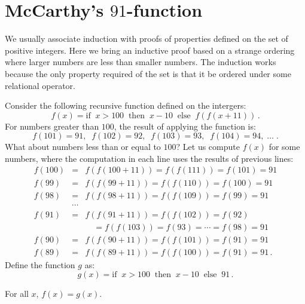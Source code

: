 \section{McCarthy's $91$-function}\label{s.induction-mccarthy}

We usually associate induction with proofs of properties defined on the set of positive integers. Here we bring an inductive proof based on a strange ordering where larger numbers are less than smaller numbers. The induction works because the only property required of the set is that it be ordered under some relational operator.

Consider the following recursive function defined on the intergers:
\[
f(x) = \textrm{if}\;\; x > 100 \;\;\textrm{then}\;\; x - 10 \;\;\textrm{else}\;\; f(f(x+11))\,.
\]
For numbers greater than $100$, the result of applying the function is:
\[
f(101) = 91, \;\; f(102) = 92,\;\; f(103) = 93,\;\; f(104) = 94,\;\ldots\;.
\]
What about numbers less than or equal to $100$? Let us compute $f(x)$ for some numbers, where the computation in each line uses the results of previous lines:
\begin{eqnarray*}
f(100) &=& f(f(100+11)) = f(f(111)) = f(101) = 91\\
f(99) &=& f(f(99+11)) = f(f(110)) = f(100) = 91\\
f(98) &=& f(f(98+11)) = f(f(109)) = f(99) = 91\\
&\cdots&\\
f(91) &=& f(f(91+11)) = f(f(102)) = f(92)\\
&& \quad = f(f(103)) = f(93) = \cdots =f(98) = 91\\
f(90) &=& f(f(90+11)) = f(f(101)) = f(91) = 91\\
f(89) &=& f(f(89+11)) = f(f(100)) = f(91) = 91\,.
\end{eqnarray*}
Define the function $g$ as:
\[
g(x) = \textrm{if}\;\; x > 100 \;\;\textrm{then}\;\; x - 10 \;\;\textrm{else}\;\; 91\,.
\]

\begin{theorem}
For all $x$, $f(x) = g(x)$.
\end{theorem}

